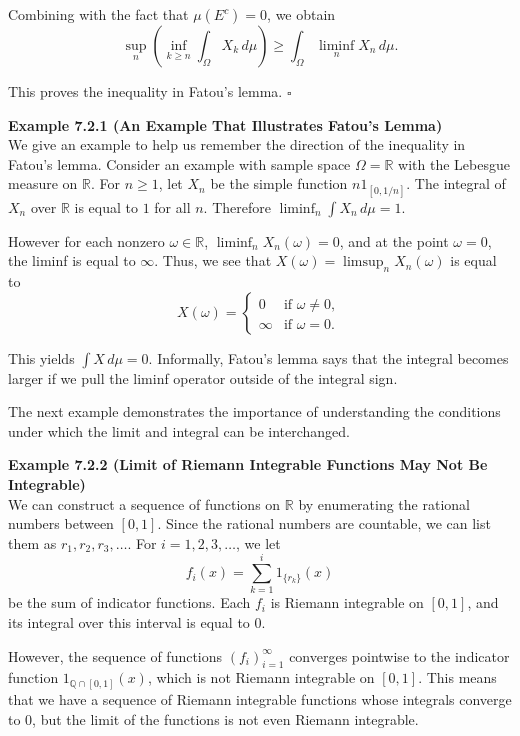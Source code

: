 Combining with the fact that $\mu(E^c)=0$, we obtain
\[
\sup_n \left( \inf_{k\ge n} \int_{\Omega} X_k\, d\mu \right) \ge \int_{\Omega} \liminf_n X_n\, d\mu.
\]

This proves the inequality in Fatou's lemma. \hfill $\square$

\textbf{Example 7.2.1 (An Example That Illustrates Fatou's Lemma)} \\
We give an example to help us remember the direction of the inequality in Fatou's lemma. Consider an example with sample space $\Omega=\mathbb{R}$ with the Lebesgue measure on $\mathbb{R}$. For $n\ge 1$, let $X_n$ be the simple function $n1_{[0,1/n]}$. The integral of $X_n$ over $\mathbb{R}$ is equal to $1$ for all $n$. Therefore $\liminf_n \int X_n\, d\mu = 1$.

However for each nonzero $\omega \in \mathbb{R}$, $\liminf_n X_n(\omega)=0$, and at the point $\omega=0$, the liminf is equal to $\infty$. Thus, we see that $X(\omega)=\limsup_n X_n(\omega)$ is equal to
\[
X(\omega)=
\begin{cases}
0 & \text{if } \omega \neq 0,\\
\infty & \text{if } \omega = 0.
\end{cases}
\]

This yields $\int X\, d\mu = 0$. Informally, Fatou's lemma says that the integral becomes larger if we pull the liminf operator outside of the integral sign.

The next example demonstrates the importance of understanding the conditions under which the limit and integral can be interchanged.

\textbf{Example 7.2.2 (Limit of Riemann Integrable Functions May Not Be Integrable)} \\
We can construct a sequence of functions on $\mathbb{R}$ by enumerating the rational numbers between $[0,1]$. Since the rational numbers are countable, we can list them as $r_1,r_2,r_3,\dots$. For $i=1,2,3,\dots$, we let
\[
f_i(x)=\sum_{k=1}^{i} 1_{\{r_k\}}(x)
\]
be the sum of indicator functions. Each $f_i$ is Riemann integrable on $[0,1]$, and its integral over this interval is equal to $0$.

However, the sequence of functions $(f_i)_{i=1}^{\infty}$ converges pointwise to the indicator function $1_{\mathbb{Q}\cap [0,1]}(x)$, which is not Riemann integrable on $[0,1]$. This means that we have a sequence of Riemann integrable functions whose integrals converge to $0$, but the limit of the functions is not even Riemann integrable.

